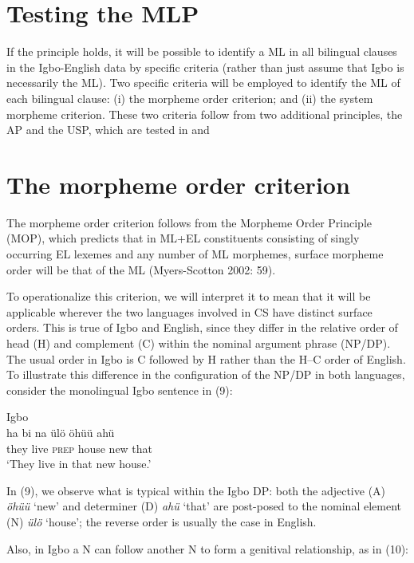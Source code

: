 \documentclass[output=paper]{langsci/langscibook}
\begin{document}
\section{Testing the MLP }

If the principle holds, it will be possible to identify a ML in all bilingual clauses in the Igbo-English data by specific criteria (rather than just assume that Igbo is necessarily the ML). Two specific criteria will be employed to identify the ML of each bilingual clause: (i) the morpheme order criterion; and (ii) the system morpheme criterion. These two criteria follow from two additional principles, the AP and the USP, which are tested in  and 

\section{The morpheme order criterion}

The morpheme order criterion follows from the Morpheme Order Principle (MOP), which predicts that in ML+EL constituents consisting of singly occurring EL lexemes and any number of ML morphemes, surface morpheme order will be that of the ML (Myers-Scotton 2002: 59). 

To operationalize this criterion, we will interpret it to mean that it will be applicable wherever the two languages involved in CS have distinct surface orders. This is true of Igbo and English, since they differ in the relative order of head (H) and complement (C) within the nominal argument phrase (NP/DP). The usual order in Igbo is C followed by H rather than the H–C order of English. To illustrate this difference in the configuration of the NP/DP in both languages, consider the monolingual Igbo sentence in (9):

\ea
{Igbo}\\
\gll ha    bi  na   ülö  öhüü  ahü\\
     they  live  \textsc{prep}  house  new  that\\
\glt ‘They live in that new house.’
\z

In (9), we observe what is typical within the Igbo DP: both the adjective (A) \textit{öhüü} ‘new’ and determiner (D) \textit{ahü} ‘that’ are post-posed to the nominal element (N) \textit{ülö }‘house’; the reverse order is usually the case in English. 

Also, in Igbo a N can follow another N to form a genitival relationship, as in (10): 
\end{document}
